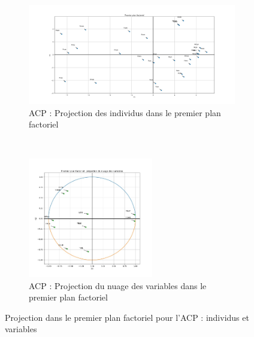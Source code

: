     \begin{figure}[!htb]
        \begin{subfigure}[b]{1.0\textwidth}
            \centering
            \includegraphics[width=1.0\textwidth]{img/mixte_acp_cah/Projection_des_individus_dans_le_premier_plan_factoriel.jpg}
            \caption{ACP : Projection des individus dans le premier plan factoriel}
            \label{Label_Projection_des_individus_dans_le_premier_plan_factoriel.jpg}
        \end{subfigure}
        \\
        \begin{subfigure}[b]{1.0\textwidth}
            \centering
            \includegraphics[width=0.6\textwidth]{img/mixte_acp_cah/Projection_du_nuage_des_variables_dans_le_premier_plan_factoriel.jpg}
            \caption{ACP : Projection du nuage des variables dans le premier plan factoriel}
            \label{Label_Projection_du_nuage_des_variables_dans_le_premier_plan_factoriel_acp.jpg}
        \end{subfigure}
        \caption{Projection dans le premier plan factoriel pour l'ACP : individus et variables}
        \label{Label_ACP_Projection_Individus_Variables}
    \end{figure}
    
